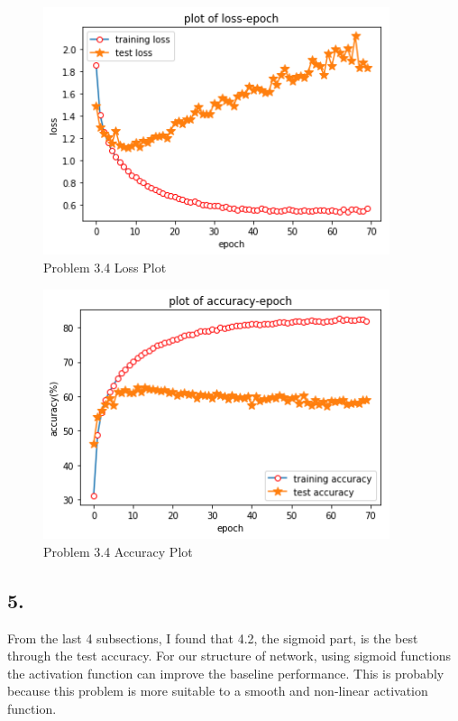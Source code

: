 \documentclass[twoside,12pt]{homework}
\begin{document}
\begin{figure}[!htb]
\begin{center}
\includegraphics[width=4in]{Unknown-7.png}
\caption{Problem 3.4 Loss Plot}
\label{fig10}
\end{center}
\end{figure}

\begin{figure}[!htb]
\begin{center}
\includegraphics[width=4in]{Unknown-8.png}
\caption{Problem 3.4 Accuracy Plot}
\label{fig11}
\end{center}
\end{figure}

\subsection*{5.}

From the last 4 subsections, I found that 4.2, the sigmoid part, is the best through the test accuracy. For our structure of network, using sigmoid functions the activation function can improve the baseline performance. This is probably because this problem is more suitable to a smooth and non-linear activation function.
\end{document}
